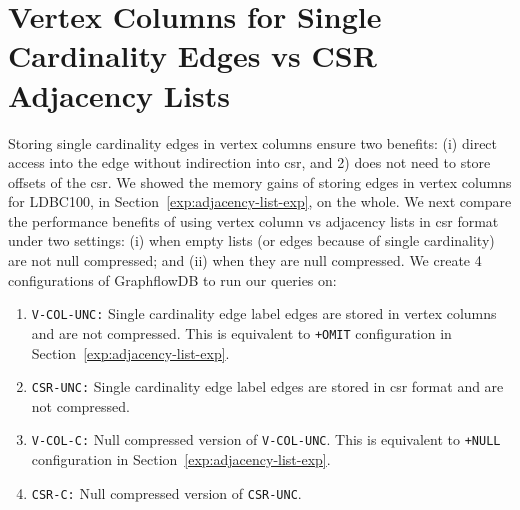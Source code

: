 
\section{Vertex Columns for Single Cardinality Edges vs CSR Adjacency Lists}
\label{exp:single-cardinality}

Storing single cardinality edges in vertex columns ensure two benefits: (i) direct access into the edge without indirection into \gls{csr}, and 2) does not need to store offsets of the \gls{csr}. We showed the memory gains of storing edges in vertex columns for LDBC100, in Section~\ref{exp:adjacency-list-exp}, on the whole. We next compare the performance benefits of using vertex column vs adjacency lists in \gls{csr} format under two settings: (i) when empty lists (or edges because of single cardinality) are not null compressed; and (ii) when they are null compressed. We create 4 configurations of GraphflowDB to run our queries on:

\begin{enumerate}
	\item \texttt{V-COL-UNC:} Single cardinality edge label edges are stored in vertex columns and are not compressed. This is equivalent to \texttt{+OMIT} configuration in Section~\ref{exp:adjacency-list-exp}.
	\item \texttt{CSR-UNC:} Single cardinality edge label edges are stored in \gls{csr} format and are not compressed.
	\item \texttt{V-COL-C:} Null compressed version of \texttt{V-COL-UNC}. This is equivalent to \texttt{+NULL} configuration in Section~\ref{exp:adjacency-list-exp}.
	\item \texttt{CSR-C:} Null compressed version of \texttt{CSR-UNC}.
\end{enumerate}

